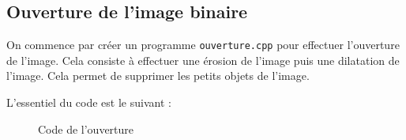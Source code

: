 \documentclass[french,a4paper,10pt]{article}
\begin{document}
	\subsection{Ouverture de l'image binaire}\label{subsec:3.2}

	On commence par créer un programme \texttt{ouverture.cpp} pour effectuer l'ouverture de l'image.
	Cela consiste à effectuer une érosion de l'image puis une dilatation de l'image.
	Cela permet de supprimer les petits objets de l'image.

	L'essentiel du code est le suivant : %
	\begin{figure}[!htb]
		\centering
		\caption{Code de l'ouverture}\label{Fig:ouverture-code}
	\end{figure}
\end{document}
